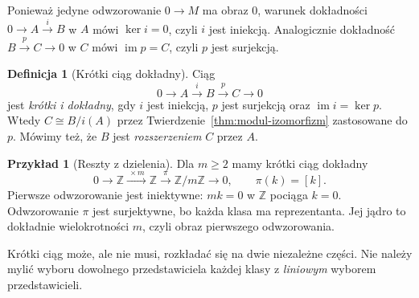 \documentclass[11pt,a4paper,oneside]{report}
\newcommand{\Z}{\mathbb{Z}}
\theoremstyle{plain}
\theoremstyle{definition}
\newtheorem{definicja}[twierdzenie]{Definicja}
\newtheorem{przyklad}[twierdzenie]{Przykład}
\theoremstyle{remark}
\begin{document}
Ponieważ jedyne odwzorowanie $0\to M$ ma obraz $0$,
warunek dokładności $0\to A\xrightarrow{i}B$
w $A$ mówi $\ker i=0$, czyli $i$ jest iniekcją.
Analogicznie dokładność
$B\xrightarrow{p}C\to0$ w $C$ mówi
$\operatorname{im}p=C$, czyli $p$ jest surjekcją.

\begin{definicja}[Krótki ciąg dokładny]
\label{def:krotki-ciag}
Ciąg
\begin{equation}\label{eq:krotki-ciag}
 0\longrightarrow A\xrightarrow{i}B
   \xrightarrow{p}C\longrightarrow0
\end{equation}
jest \emph{krótki i dokładny}, gdy $i$ jest
iniekcją, $p$ jest surjekcją oraz
$\operatorname{im}i=\ker p$.
Wtedy $C\cong B/i(A)$ przez
Twierdzenie~\ref{thm:modul-izomorfizm}
zastosowane do $p$. Mówimy też,
że $B$ jest \emph{rozszerzeniem} $C$ przez $A$.
\end{definicja}

\begin{przyklad}[Reszty z dzielenia]
\label{prz:ses-mod-m}
Dla $m\geq2$ mamy krótki ciąg dokładny
\[
 0\longrightarrow\Z\xrightarrow{\ \times m\ }\Z
   \xrightarrow{\ \pi\ }\Z/m\Z\longrightarrow0,
 \qquad \pi(k)=[k].
\]
Pierwsze odwzorowanie jest iniektywne: $mk=0$
w $\Z$ pociąga $k=0$. Odwzorowanie $\pi$ jest
surjektywne, bo każda klasa ma reprezentanta.
Jej jądro to dokładnie wielokrotności $m$,
czyli obraz pierwszego odwzorowania.
\end{przyklad}

Krótki ciąg może, ale nie musi, rozkładać się
na dwie niezależne części. Nie należy mylić
wyboru dowolnego przedstawiciela każdej klasy
z \emph{liniowym} wyborem przedstawicieli.
\end{document}
